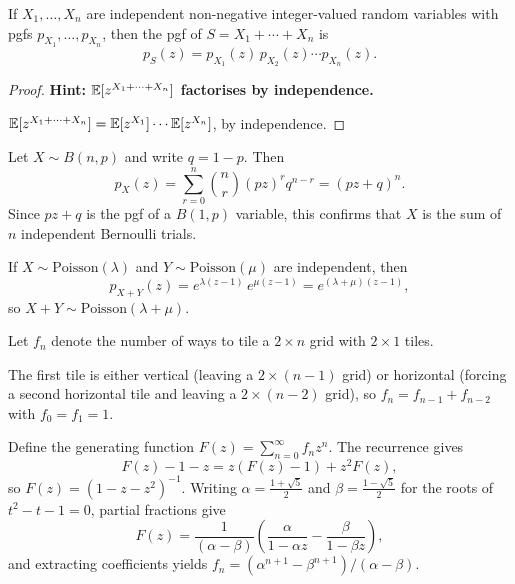 \documentclass[a4paper]{article}
\begin{document}
\begin{thm}
  If $X_1, \dotsc, X_n$ are independent non-negative integer-valued random variables with pgfs $p_{X_1}, \dotsc, p_{X_n}$, then the pgf of $S = X_1 + \cdots + X_n$ is
  \[
    p_S(z) = p_{X_1}(z)\, p_{X_2}(z) \cdots p_{X_n}(z).
  \]
\end{thm}

\begin{proof}
  \textbf{Hint: $\mathbb{E}[z^{X_1 + \dotsb + X_n}]$ factorises by independence.}

  $\mathbb{E}[z^{X_1 + \cdots + X_n}] = \mathbb{E}[z^{X_1}]\cdots\mathbb{E}[z^{X_n}]$, by independence.
\end{proof}

\begin{eg}
  Let $X\sim B(n, p)$ and write $q = 1 - p$. Then
  \[
    p_X(z) = \sum_{r = 0}^{n} \binom{n}{r} (pz)^r q^{n - r} = (pz + q)^n.
  \]
  Since $pz + q$ is the pgf of a $B(1,p)$ variable, this confirms that $X$ is the sum of $n$ independent Bernoulli trials.
\end{eg}

\begin{eg}
  If $X \sim \mathrm{Poisson}(\lambda)$ and $Y \sim \mathrm{Poisson}(\mu)$ are independent, then
  \[
    p_{X+Y}(z) = e^{\lambda(z - 1)}\, e^{\mu(z - 1)} = e^{(\lambda + \mu)(z - 1)},
  \]
  so $X + Y \sim \mathrm{Poisson}(\lambda + \mu)$.
\end{eg}

\begin{eg}
  Let $f_n$ denote the number of ways to tile a $2 \times n$ grid with $2 \times 1$ tiles.
  \begin{center}
  \end{center}
  The first tile is either vertical (leaving a $2 \times (n-1)$ grid) or horizontal (forcing a second horizontal tile and leaving a $2 \times (n-2)$ grid), so $f_n = f_{n-1} + f_{n-2}$ with $f_0 = f_1 = 1$.

  Define the generating function $F(z) = \sum_{n=0}^\infty f_n z^n$. The recurrence gives
  \[
    F(z) - 1 - z = z(F(z) - 1) + z^2 F(z),
  \]
  so $F(z) = (1 - z - z^2)^{-1}$. Writing $\alpha = \frac{1+\sqrt{5}}{2}$ and $\beta = \frac{1-\sqrt{5}}{2}$ for the roots of $t^2 - t - 1 = 0$, partial fractions give
  \[
    F(z) = \frac{1}{(\alpha - \beta)}\left(\frac{\alpha}{1 - \alpha z} - \frac{\beta}{1 - \beta z}\right),
  \]
  and extracting coefficients yields $f_n = (\alpha^{n+1} - \beta^{n+1})/(\alpha - \beta)$.
\end{eg}
\end{document}
